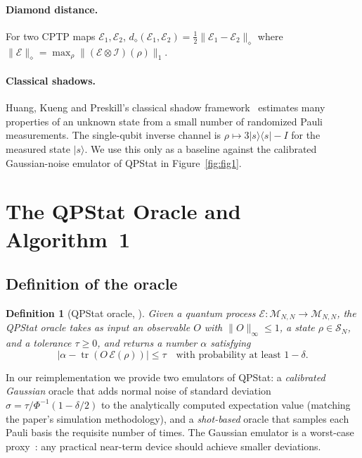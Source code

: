 \documentclass[11pt]{article}
\newtheorem{definition}{Definition}
\newcommand{\E}{\mathcal{E}}
\newcommand{\tr}{\operatorname{tr}}
\newcommand{\diam}{\mathord\diamond}
\begin{document}
\paragraph{Diamond distance.}
For two CPTP maps $\E_1, \E_2$,
$d_\diam(\E_1,\E_2) = \tfrac12 \|\E_1 - \E_2\|_\diam$ where
$\|\E\|_\diam = \max_{\rho} \|(\E\otimes\mathcal{I})(\rho)\|_1$.

\paragraph{Classical shadows.}
Huang, Kueng and Preskill's classical shadow framework~\cite{huang2020shadow}
estimates many properties of an unknown state from a small number of
randomized Pauli measurements. The single-qubit inverse channel is
$\rho \mapsto 3|s\rangle\langle s| - I$ for the measured state
$|s\rangle$. We use this only as a baseline against the calibrated
Gaussian-noise emulator of QPStat in Figure~\ref{fig:fig1}.

\section{The QPStat Oracle and Algorithm~1}\label{sec:qpstat}

\subsection{Definition of the oracle}

\begin{definition}[QPStat oracle, \cite{wadhwa2024qpsq}]
  Given a quantum process $\E : \mathcal{M}_{N,N} \to \mathcal{M}_{N,N}$,
  the QPStat oracle takes as input an observable $O$ with
  $\|O\|_\infty \le 1$, a state $\rho \in \mathcal{S}_N$, and a
  tolerance $\tau \ge 0$, and returns a number $\alpha$ satisfying
  \begin{equation}
    \bigl|\alpha - \tr(O\,\E(\rho))\bigr| \le \tau
    \quad \text{with probability at least } 1 - \delta.
  \end{equation}
\end{definition}

In our reimplementation we provide two emulators of QPStat: a
\emph{calibrated Gaussian} oracle that adds normal noise of standard
deviation $\sigma = \tau / \Phi^{-1}(1 - \delta/2)$ to the analytically
computed expectation value (matching the paper's simulation
methodology), and a \emph{shot-based} oracle that samples each Pauli
basis the requisite number of times. The Gaussian emulator is a
worst-case proxy~\cite{huang2020shadow}: any practical near-term device
should achieve smaller deviations.
\end{document}
